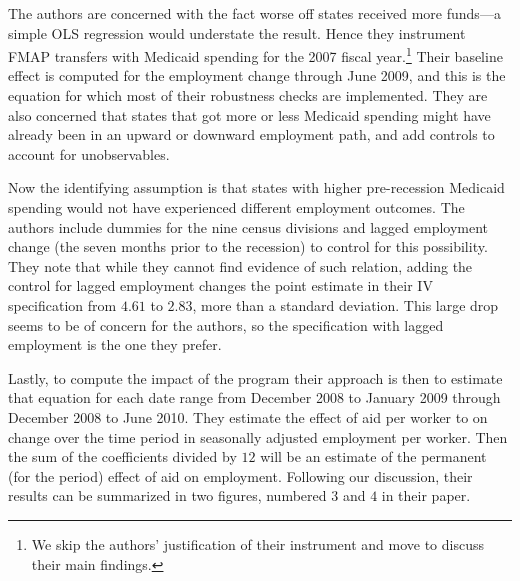 \documentclass{article}
\begin{document}
The authors are concerned with the fact worse off states received more funds---a simple OLS regression would understate the result. Hence they instrument FMAP transfers with Medicaid spending for the 2007 fiscal year.\footnote{We skip the authors' justification of their instrument and move to discuss their main findings.} Their baseline effect is computed for the employment change through June 2009, and this is the equation for which most of their robustness checks are implemented. They are also concerned that states that got more or less Medicaid spending might have already been in an upward or downward employment path, and add controls to account for unobservables.

Now the identifying assumption is that states with higher pre-recession Medicaid spending would not have experienced different employment outcomes. The authors include dummies for the nine census divisions and lagged employment change (the seven months prior to the recession) to control for this possibility. They note that while they cannot find evidence of such relation, adding the control for lagged employment changes the point estimate in their IV specification from $4.61$ to $2.83$, more than a standard deviation. This large drop seems to be of concern for the authors, so the specification with lagged employment is the one they prefer.

Lastly, to compute the impact of the program their approach is then to estimate that equation for each date range from December 2008 to January 2009 through December 2008 to June 2010. They estimate the effect of aid per worker to on change over the time period in seasonally adjusted employment per worker. Then the sum of the coefficients divided by $12$ will be an estimate of the permanent (for the period) effect of aid on employment. Following our discussion, their results can be summarized in two figures, numbered $3$ and $4$ in their paper.
\end{document}
